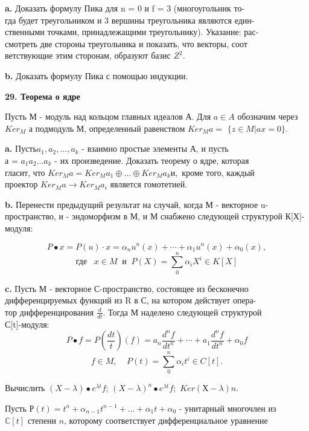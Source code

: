 {\bf a.} Доказать формулу Пика для n = 0 и f = 3 (многоугольник 
то-\\гда будет треугольником и 3 вершины треугольника являются 
един-\\ственными точками, принадлежащими треугольнику). Указание: 
рас-\\смотреть две стороны треугольника и показать, что векторы, 
соот\\ветствующие этим сторонам, образуют базис $Z^2$. 

{\bf b.} Доказать формулу Пика с помощью индукции.

{\noindent\bf29. Теорема о ядре} 

Пусть М - модуль над кольцом главных идеалов А. Для $a \in A$ 
обозначим через $Ker_M$ а подмодуль М, определенный равенством $Ker_M a =$ 
$ \{z \in M| ax=0\} $. 

{\bf a.} Пусть$a_1,a_2,...,a_k$ - взаимно простые элементы А, и пусть \\
а = $a_1a_2... a_k$ - их произведение. Доказать теорему о ядре, которая\\ 
гласит, что  $Ker_M a = Ker_M a_1 \oplus...\oplus Ker_M a_k и,$ кроме того, каждый\\ 
проектор $Ker_Ma \to Ker_M a_i $ является гомотетией. 

{\bf b.} Перенести предыдущий результат на случай, когда М - 
векторное u-пространство, и - эндоморфизм в М, и М снабжено следующей 
структурой К[Х]-модуля: 

$$ P\bullet x=P(u)\cdot x = \alpha_nu^n(x)+\cdots+\alpha_1u^n(x)+\alpha_0(x), $$
$$\displaystyle \text{где}\;\;\;x\in M\;\; \text{и}\;\;  P(X) = \sum^n_0\alpha_iX^i\in K[X] $$

{\bf c.} Пусть М - векторное С-пространство, состоящее из бесконечно\\ 
дифференцируемых функций из R в С, на котором действует 
опера-\\тор дифференцирования $\frac{d}{dt}$. Тогда М наделено следующей структурой\\ 
С[t]-модуля: 
$$ P\bullet f=P(\frac{dt}{t})(f)=a_n\frac{d^nf}{dt^n}+\cdots+a_1\frac{d^nf}{dt^n}+\alpha_0f$$
$$\displaystyle f \in M,\;\;\;\;P(t)=\sum^n_0\alpha_it^i\in C[t]. $$

\pagebreak

Вычислить $(X - \lambda) \bullet e^{\lambda t}f$; $(X - \lambda)^n \bullet e^{\lambda t}f;$ $Ker (Х - \lambda)n.$

\medskip

Пусть $Р(t) = t^n+\alpha_{n-1}t^{n-1}+...+\alpha_1t+\alpha_0$ - унитарный многочлен из \\
$\mathbb{C}[t]$ степени $n$, которому соответствует дифференциальное уравнение 

